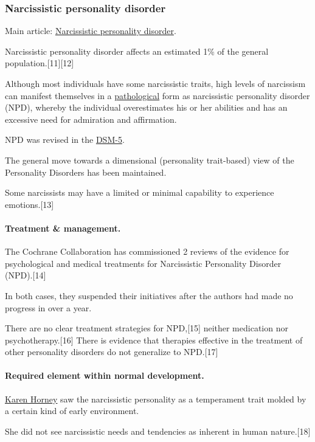 \documentclass[oneside]{book}
\numberwithin{equation}{section}
\begin{document}
\subsubsection{Narcissistic personality disorder}
Main article: \href{https://en.wikipedia.org/wiki/Narcissistic_personality_disorder}{Narcissistic personality disorder}.

Narcissistic personality disorder affects an estimated 1\% of the general population.[11][12]

Although most individuals have some narcissistic traits, high levels of narcissism can manifest themselves in a \href{https://en.wikipedia.org/wiki/Psychopathology}{pathological} form as narcissistic personality disorder (NPD), whereby the individual overestimates his or her abilities and has an excessive need for admiration and affirmation.

NPD was revised in the \href{https://en.wikipedia.org/wiki/DSM-5}{DSM-5}.

The general move towards a dimensional (personality trait-based) view of the Personality Disorders has been maintained.

Some narcissists may have a limited or minimal capability to experience emotions.[13]

\paragraph{Treatment \& management.} The Cochrane Collaboration has commissioned 2 reviews of the evidence for psychological and medical treatments for Narcissistic Personality Disorder (NPD).[14]

In both cases, they suspended their initiatives after the authors had made no progress in over a year.

There are no clear treatment strategies for NPD,[15] neither medication nor psychotherapy.[16] There is evidence that therapies effective in the treatment of other personality disorders do not generalize to NPD.[17]

\paragraph{Required element within normal development.} \href{https://en.wikipedia.org/wiki/Karen_Horney}{Karen Horney} saw the narcissistic personality as a temperament trait molded by a certain kind of early environment.

She did not see narcissistic needs and tendencies as inherent in human nature.[18]
\end{document}

